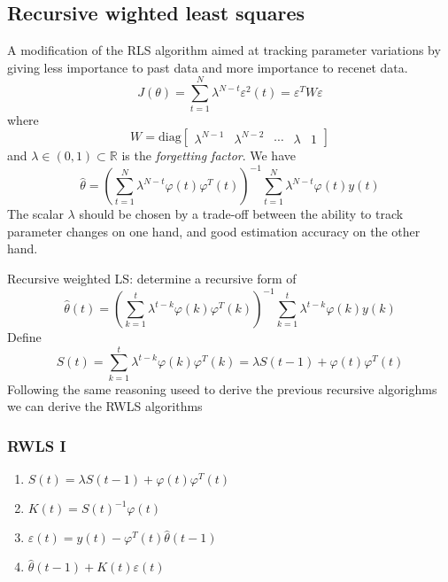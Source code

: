 \documentclass{book}
\newcommand{\R}{\mathbb{R}}
\theoremstyle{definition}
\theoremstyle{remark}
\theoremstyle{remark}
\begin{document}
\subsection{Recursive wighted least squares}
A modification of the RLS algorithm aimed at tracking  parameter variations by giving less importance to past data and more importance to recenet data.
\[
    J(\theta)=\sum_{t=1}^{N}\lambda^{N-t}\varepsilon^2(t)=\varepsilon^TW\varepsilon
\]
where
\[
    W=\text{diag}\begin{bmatrix} \lambda^{N-1} & \lambda^{N-2} & \cdots & \lambda & 1 \end{bmatrix}    
\]
and $\lambda\in(0,1)\subset \R$ is the \emph{forgetting factor}. We have
\[
    \hat{\theta} = \left( \sum_{t=1}^{N}\lambda^{N-t}\varphi(t)\varphi^T(t) \right)^{-1}\sum_{t=1}^{N}\lambda^{N-t}\varphi(t)y(t)
\]
The scalar $\lambda$ should be chosen by a trade-off between the ability to track parameter changes on one hand, and good estimation accuracy on the other hand.

Recursive weighted LS: determine a recursive form of 
\[
    \hat{\theta} (t) = \left( \sum_{k=1}^t \lambda^{t-k}\varphi(k)\varphi^T(k) \right) ^{-1} \sum_{k=1}^t \lambda^{t-k}\varphi(k)y(k)
\]
Define
\[
    S(t)=\sum_{k=1}^t \lambda^{t-k}\varphi(k)\varphi^T(k)=\lambda S(t-1)+\varphi(t)\varphi^T(t)
\]
Following the same reasoning useed to derive the previous recursive algorighms we can derive the RWLS algorithms
\subsubsection{RWLS I}
\begin{enumerate}
    \item $S(t) = \lambda S(t-1) + \varphi(t)\varphi^T(t)$
    \item $K(t) = S(t)^{-1}\varphi(t)$
    \item $\varepsilon(t) = y(t) - \varphi^T(t) \hat{\theta}(t-1)$
    \item $\hat{\theta}(t-1)+K(t)\varepsilon(t)$
\end{enumerate}
\end{document}
